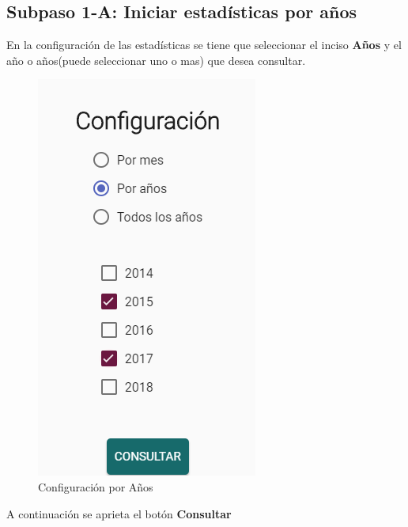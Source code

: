 \subsection{Subpaso 1-A: Iniciar estadísticas por años}
	En la configuración de las estadísticas se tiene que seleccionar el 
	inciso \textbf{Años} y el año o años(puede seleccionar uno o mas) que desea 
	consultar.
		
	\begin{figure}[hbtp]

	\includegraphics[scale=0.5]{images/InterfazMovil/IUGS15_configuracioAnos.PNG}
	\caption{Configuración por Años }
	\end{figure}
	A continuación se aprieta el botón \textbf{Consultar}
	
